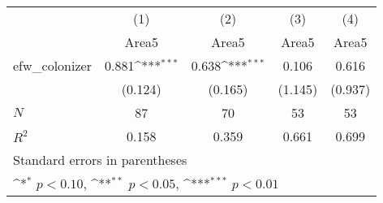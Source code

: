 {
\def\sym#1{\ifmmode^{#1}\else\(^{#1}\)\fi}
\begin{tabular}{l*{4}{c}}
\hline\hline
            &\multicolumn{1}{c}{(1)}&\multicolumn{1}{c}{(2)}&\multicolumn{1}{c}{(3)}&\multicolumn{1}{c}{(4)}\\
            &\multicolumn{1}{c}{Area5}&\multicolumn{1}{c}{Area5}&\multicolumn{1}{c}{Area5}&\multicolumn{1}{c}{Area5}\\
\hline
efw\_colonizer&       0.881\sym{***}&       0.638\sym{***}&       0.106         &       0.616         \\
            &     (0.124)         &     (0.165)         &     (1.145)         &     (0.937)         \\
\hline
\(N\)       &          87         &          70         &          53         &          53         \\
\(R^{2}\)   &       0.158         &       0.359         &       0.661         &       0.699         \\
\hline\hline
\multicolumn{5}{l}{\footnotesize Standard errors in parentheses}\\
\multicolumn{5}{l}{\footnotesize \sym{*} \(p<0.10\), \sym{**} \(p<0.05\), \sym{***} \(p<0.01\)}\\
\end{tabular}
}
